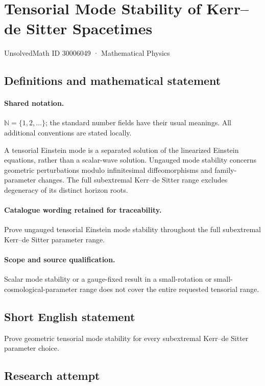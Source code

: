 \documentclass[11pt]{article}
\begin{document}
\setcounter{section}{30006048}
\section{Tensorial Mode Stability of Kerr–de Sitter Spacetimes}\label{30006049}
{\small UnsolvedMath ID 30006049 · Mathematical Physics}
\subsection{Definitions and mathematical statement}

\paragraph{Shared notation.}$\mathbb N=\{1,2,\ldots\}$; the standard number fields have their usual meanings. All additional conventions are stated locally.


A tensorial Einstein mode is a separated solution of the linearized Einstein equations, rather than a scalar-wave solution. Ungauged mode stability concerns geometric perturbations modulo infinitesimal diffeomorphisms and family-parameter changes. The full subextremal Kerr--de Sitter range excludes degeneracy of its distinct horizon roots.

\paragraph{Catalogue wording retained for traceability.}
Prove ungauged tensorial Einstein mode stability throughout the full subextremal Kerr–de Sitter parameter range.

\paragraph{Scope and source qualification.}Scalar mode stability or a gauge-fixed result in a small-rotation or small-cosmological-parameter range does not cover the entire requested tensorial range.
\subsection{Short English statement}
Prove geometric tensorial mode stability for every subextremal Kerr--de Sitter parameter choice.
\subsection{Research attempt}
\end{document}
